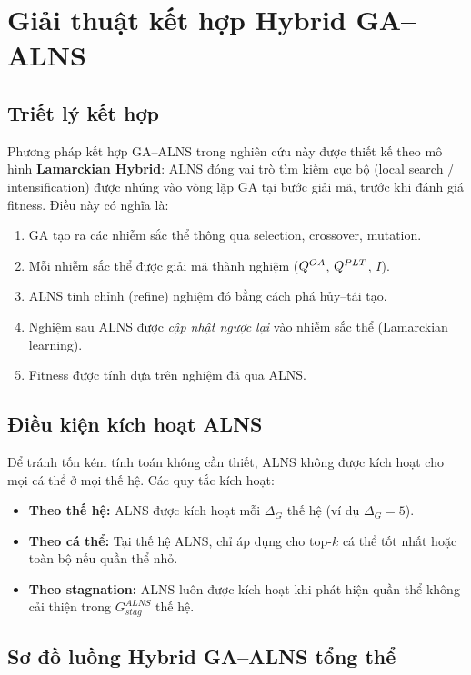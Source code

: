 
\section{Giải thuật kết hợp Hybrid GA--ALNS}

\subsection{Triết lý kết hợp}

Phương pháp kết hợp GA--ALNS trong nghiên cứu này được thiết kế theo mô hình \textbf{Lamarckian Hybrid}: ALNS đóng vai trò tìm kiếm cục bộ (local search / intensification) được nhúng vào vòng lặp GA tại bước giải mã, trước khi đánh giá fitness. Điều này có nghĩa là:

\begin{enumerate}
  \item GA tạo ra các nhiễm sắc thể thông qua selection, crossover, mutation.
  \item Mỗi nhiễm sắc thể được giải mã thành nghiệm ($Q^{OA}$, $Q^{PLT}$, $I$).
  \item ALNS tinh chỉnh (refine) nghiệm đó bằng cách phá hủy--tái tạo.
  \item Nghiệm sau ALNS được \emph{cập nhật ngược lại} vào nhiễm sắc thể (Lamarckian learning).
  \item Fitness được tính dựa trên nghiệm đã qua ALNS.
\end{enumerate}

\subsection{Điều kiện kích hoạt ALNS}

Để tránh tốn kém tính toán không cần thiết, ALNS không được kích hoạt cho mọi cá thể ở mọi thế hệ. Các quy tắc kích hoạt:

\begin{itemize}
  \item \textbf{Theo thế hệ:} ALNS được kích hoạt mỗi $\Delta_G$ thế hệ (ví dụ $\Delta_G = 5$).
  \item \textbf{Theo cá thể:} Tại thế hệ ALNS, chỉ áp dụng cho top-$k$ cá thể tốt nhất hoặc toàn bộ nếu quần thể nhỏ.
  \item \textbf{Theo stagnation:} ALNS luôn được kích hoạt khi phát hiện quần thể không cải thiện trong $G_{stag}^{ALNS}$ thế hệ.
\end{itemize}

\subsection{Sơ đồ luồng Hybrid GA--ALNS tổng thể}


